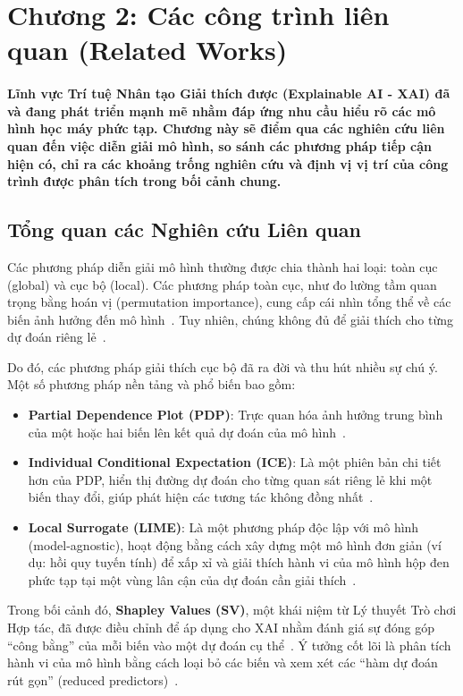 \documentclass[12pt, a4paper]{article}
\begin{document}
\section*{Chương 2: Các công trình liên quan (Related Works)}
\paragraph{
Lĩnh vực Trí tuệ Nhân tạo Giải thích được (Explainable AI - XAI) đã và đang phát triển mạnh mẽ nhằm đáp ứng nhu cầu hiểu rõ các mô hình học máy phức tạp. Chương này sẽ điểm qua các nghiên cứu liên quan đến việc diễn giải mô hình, so sánh các phương pháp tiếp cận hiện có, chỉ ra các khoảng trống nghiên cứu và định vị vị trí của công trình được phân tích trong bối cảnh chung.
}

\subsection*{Tổng quan các Nghiên cứu Liên quan}

Các phương pháp diễn giải mô hình thường được chia thành hai loại: toàn cục (global) và cục bộ (local). Các phương pháp toàn cục, như đo lường tầm quan trọng bằng hoán vị (permutation importance), cung cấp cái nhìn tổng thể về các biến ảnh hưởng đến mô hình~\citep{ref_253}. Tuy nhiên, chúng không đủ để giải thích cho từng dự đoán riêng lẻ~\citep{ref_253}.

Do đó, các phương pháp giải thích cục bộ đã ra đời và thu hút nhiều sự chú ý. Một số phương pháp nền tảng và phổ biến bao gồm:
\begin{itemize}
    \item \textbf{Partial Dependence Plot (PDP)}: Trực quan hóa ảnh hưởng trung bình của một hoặc hai biến lên kết quả dự đoán của mô hình~\citep{ref_259}.
    \item \textbf{Individual Conditional Expectation (ICE)}: Là một phiên bản chi tiết hơn của PDP, hiển thị đường dự đoán cho từng quan sát riêng lẻ khi một biến thay đổi, giúp phát hiện các tương tác không đồng nhất~\citep{ref_259}.
    \item \textbf{Local Surrogate (LIME)}: Là một phương pháp độc lập với mô hình (model-agnostic), hoạt động bằng cách xây dựng một mô hình đơn giản (ví dụ: hồi quy tuyến tính) để xấp xỉ và giải thích hành vi của mô hình hộp đen phức tạp tại một vùng lân cận của dự đoán cần giải thích~\citep{ref_259}.
\end{itemize}

Trong bối cảnh đó, \textbf{Shapley Values (SV)}, một khái niệm từ Lý thuyết Trò chơi Hợp tác, đã được điều chỉnh để áp dụng cho XAI nhằm đánh giá sự đóng góp ``công bằng'' của mỗi biến vào một dự đoán cụ thể~\citep{ref_261}. Ý tưởng cốt lõi là phân tích hành vi của mô hình bằng cách loại bỏ các biến và xem xét các ``hàm dự đoán rút gọn'' (reduced predictors)~\citep{ref_264}.
\end{document}
